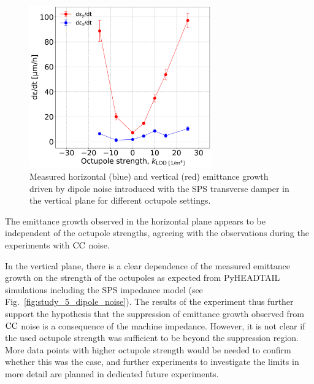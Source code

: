 \begin{figure}[!h]
   \centering         
   \includegraphics[width=0.7\textwidth]{images/Ch8/emitGrowth_H_V_dipole_noise_damper_md_measurements.png}
       \caption{Measured horizontal (blue) and vertical (red) emittance growth driven by dipole noise introduced with the SPS transverse damper in the vertical plane for different octupole settings.}
       \label{fig:coast_dipole_noise_damper_md_2022_measurement}
\end{figure}


The emittance growth observed in the horizontal plane appears to be independent of the octupole strengths, agreeing with the observations during the experiments with ${\mathrm{CC}}$ noise. 

In the vertical plane, there is a clear dependence of the measured emittance growth on the strength of the octupoles as expected from PyHEADTAIL simulations including the SPS impedance model (see Fig.~\ref{fig:study_5_dipole_noise}). The results of the experiment thus further support the hypothesis that the suppression of emittance growth observed from ${\mathrm{CC}}$ noise is a consequence of the machine impedance. However, it is not clear if the used octupole strength was sufficient to be beyond the suppression region. More data points with higher octupole strength would be needed to confirm whether this was the case, and further experiments to investigate the limits in more detail are planned in dedicated future experiments.

  

